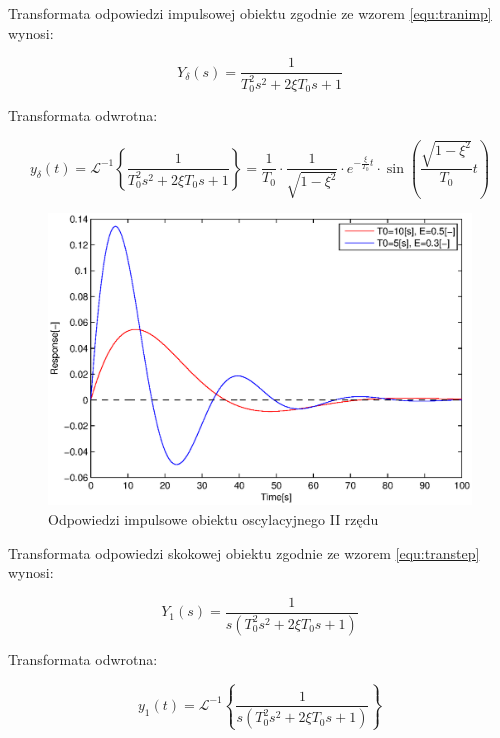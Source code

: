 \documentclass[12pt]{article}
\begin{document}
Transformata odpowiedzi impulsowej obiektu zgodnie ze wzorem \eqref{equ:tranimp}
wynosi:

\begin{equation*}
	Y_{\delta}(s)=\frac{1}{T_0^2s^2+2\xi T_0s+1}
\end{equation*}

Transformata odwrotna:

\begin{equation*}
	y_{\delta}(t)=\mathcal{L}^{-1}\left\{\frac{1}{T_0^2s^2+2\xi T_0s+1}\right\} =
	\frac{1}{T_0}\cdot \frac{1}{\sqrt{1-\xi^2}} \cdot e^{-\frac{\xi}{T_0}t} 
	\cdot \sin\left(\frac{\sqrt{1-\xi^2}}{T_0}t\right)
\end{equation*}

\begin{figure}[!htb]
	\begin{center}
		\includegraphics[width=14cm]{../res/img/imp3.eps}
	\end{center}
	\caption{Odpowiedzi impulsowe obiektu oscylacyjnego II rzędu}
\end{figure}

\newpage

Transformata odpowiedzi skokowej obiektu zgodnie ze wzorem \eqref{equ:transtep}
wynosi:

\begin{equation*}
	Y_{1}(s)=\frac{1}{s(T_0^2s^2+2\xi T_0s+1)}
\end{equation*}

Transformata odwrotna:

\begin{equation*}
	y_{1}(t)=\mathcal{L}^{-1}\left\{\frac{1}{s(T_0^2s^2+2\xi T_0s+1)}\right\}
\end{equation*}
\end{document}
